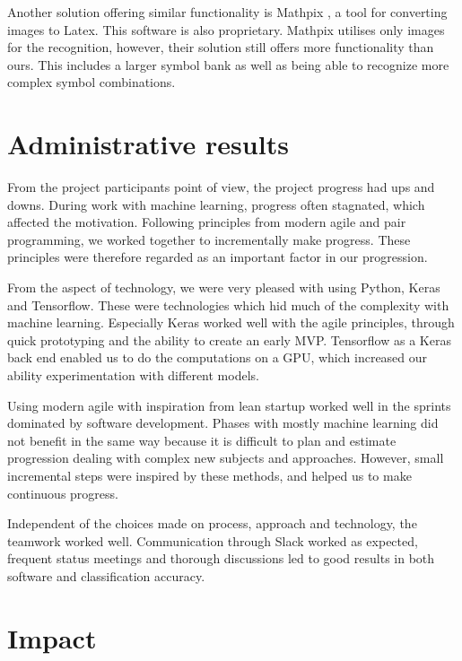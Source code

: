 Another solution offering similar functionality is Mathpix \cite{mathpix_mathpix:_2018}, a tool for converting images to Latex. This software is also proprietary. Mathpix utilises only images for the recognition, however, their solution still offers more functionality than ours. This includes a larger symbol bank as well as being able to recognize more complex symbol combinations.

\section{Administrative results}

From the project participants point of view, the project progress had ups and downs. During work with machine learning, progress often stagnated, which affected the motivation. Following principles from modern agile and pair programming, we worked together to incrementally make progress. These principles were therefore regarded as an important factor in our progression.

From the aspect of technology, we were very pleased with using Python, Keras and Tensorflow. These were technologies which hid much of the complexity with machine learning. Especially Keras worked well with the agile principles, through quick prototyping and the ability to create an early MVP. Tensorflow as a Keras back end enabled us to do the computations on a GPU, which increased our ability experimentation with different models.

Using modern agile with inspiration from lean startup worked well in the sprints dominated by software development. Phases with mostly machine learning did not benefit in the same way because it is difficult to plan and estimate progression dealing with complex new subjects and approaches. However, small incremental steps were inspired by these methods, and helped us to make continuous progress.

Independent of the choices made on process, approach and technology, the teamwork worked well. Communication through Slack worked as expected, frequent status meetings and thorough discussions led to good results in both software and classification accuracy.

\section{Impact}

